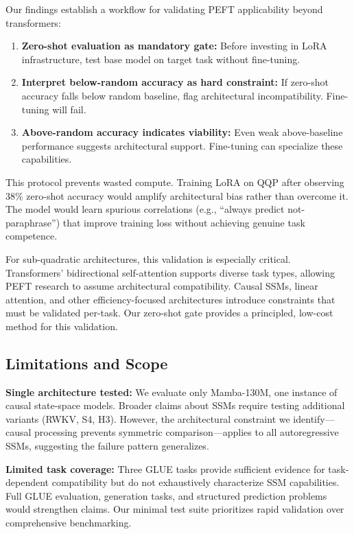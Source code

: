 Our findings establish a workflow for validating PEFT applicability beyond transformers:

\begin{enumerate}
\item \textbf{Zero-shot evaluation as mandatory gate:} Before investing in LoRA infrastructure, test base model on target task without fine-tuning.
\item \textbf{Interpret below-random accuracy as hard constraint:} If zero-shot accuracy falls below random baseline, flag architectural incompatibility. Fine-tuning will fail.
\item \textbf{Above-random accuracy indicates viability:} Even weak above-baseline performance suggests architectural support. Fine-tuning can specialize these capabilities.
\end{enumerate}

This protocol prevents wasted compute. Training LoRA on QQP after observing 38\% zero-shot accuracy would amplify architectural bias rather than overcome it. The model would learn spurious correlations (e.g., ``always predict not-paraphrase'') that improve training loss without achieving genuine task competence.

For sub-quadratic architectures, this validation is especially critical. Transformers' bidirectional self-attention supports diverse task types, allowing PEFT research to assume architectural compatibility. Causal SSMs, linear attention, and other efficiency-focused architectures introduce constraints that must be validated per-task. Our zero-shot gate provides a principled, low-cost method for this validation.

\subsection{Limitations and Scope}

\textbf{Single architecture tested:} We evaluate only Mamba-130M, one instance of causal state-space models. Broader claims about SSMs require testing additional variants (RWKV, S4, H3). However, the architectural constraint we identify---causal processing prevents symmetric comparison---applies to all autoregressive SSMs, suggesting the failure pattern generalizes.

\textbf{Limited task coverage:} Three GLUE tasks provide sufficient evidence for task-dependent compatibility but do not exhaustively characterize SSM capabilities. Full GLUE evaluation, generation tasks, and structured prediction problems would strengthen claims. Our minimal test suite prioritizes rapid validation over comprehensive benchmarking.

